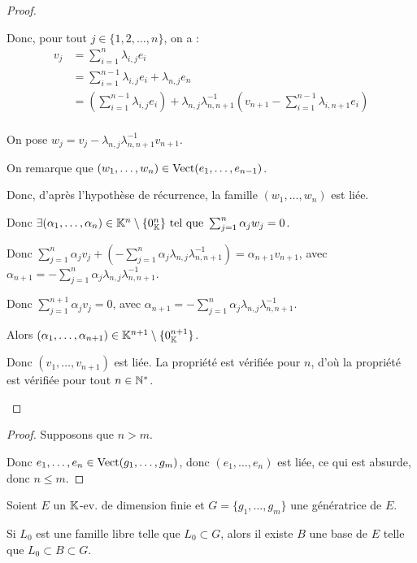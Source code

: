 \documentclass[12pt,a4paper]{report}
\begin{document}
\begin{proof}
\begin{outline}
        \1 Donc, pour tout $j \in \{1,2,\dots,n\}$, on a :
        $$\begin{aligned}
v_j &= \sum_{i=1}^n \lambda_{i,j} e_i\\
&= \sum_{i=1}^{n-1} \lambda_{i,j} e_i + \lambda_{n,j} e_n\\
&= \left(\sum_{i=1}^{n-1} \lambda_{i,j} e_i\right) + \lambda_{n,j} \lambda_{n,n+1}^{-1} \left(v_{n+1} - \sum_{i=1}^{n-1} \lambda_{i,n+1} e_i\right)\\
\end{aligned}$$

    \1 On pose $w_j = v_j - \lambda_{n,j} \lambda_{n,n+1}^{-1} v_{n+1}$.

    \1 On remarque que $(w_1,\dots,w_n) \in \mathrm{Vect}(e_1,\dots,e_{n-1})$.

    \1 Donc, d'après l'hypothèse de récurrence, la famille $(w_1,\dots,w_n)$ est liée.

    \1 Donc $\exists (\alpha_1,\dots,\alpha_n) \in \mathbb{K}^n\setminus\{0_{\mathbb{K}}^n\} \text{ tel que } \sum_{j=1}^n \alpha_j w_j = 0$.

    \1 Donc $\sum_{j=1}^n \alpha_j v_j + \left(-\sum_{j=1}^n \alpha_j\lambda_{n,j} \lambda_{n,n+1}^{-1}\right) = \alpha_{n+1} v_{n+1}$, avec $\alpha_{n+1} = -\sum_{j=1}^n \alpha_j\lambda_{n,j} \lambda_{n,n+1}^{-1}$.

    \1 Donc $\sum_{j=1}^{n+1} \alpha_j v_j = 0$, avec $\alpha_{n+1} = -\sum_{j=1}^n \alpha_j\lambda_{n,j} \lambda_{n,n+1}^{-1}$.

    \1 Alors $(\alpha_1,\dots,\alpha_{n+1}) \in \mathbb{K}^{n+1}\setminus\{0_{\mathbb{K}}^{n+1}\}$.

    \1 Donc $(v_1,\dots,v_{n+1})$ est liée. La propriété est vérifiée pour $n$, d'où la propriété est vérifiée pour tout $n \in \mathbb{N}^*$.
    \end{outline}
\end{proof}

\begin{proof}
    Supposons que $n > m$.

    Donc $e_1,\dots,e_n \in \mathrm{Vect}(g_1,\dots,g_m)$, donc $(e_1,\dots,e_n)$ est liée, ce qui est absurde, donc $n \le m$.
\end{proof}

\begin{property}
    Soient $E$ un $\mathbb{K}$-ev. de dimension finie et $G = \{g_1,\dots,g_m\}$ une génératrice de $E$.

    Si $L_0$ est une famille libre telle que $L_0 \subset G$, alors il existe $B$ une base de $E$ telle que $L_0 \subset B \subset G$.
    \label{prop:base_incomplete_famille_libre_subset_generatrice}
\end{property}
\end{document}
